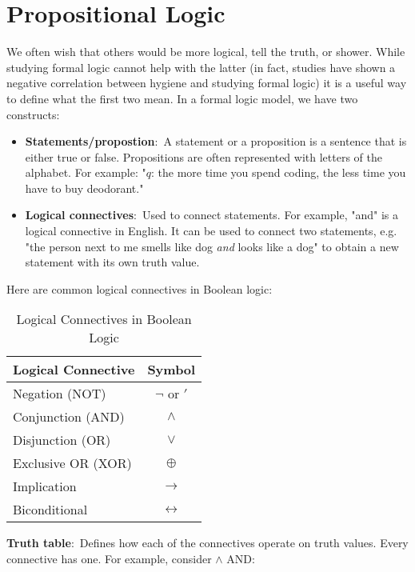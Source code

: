 \documentclass[nobib]{tufte-handout}
\newcommand{\defn}[2]{\noindent\textbf{#1}:\ #2}
\begin{document}
\pagebreak

\section{Propositional Logic}

We often wish that others would be more logical, tell the truth,
or shower. While studying formal logic cannot help with the latter
(in fact, studies have shown a negative correlation between
hygiene and studying formal logic) it is a useful way to 
define what the first two mean. In a formal logic model, we have two constructs:
\begin{itemize}
    \item \defn{Statements/propostion}{A statement or a proposition is a sentence that
    is either true or false.} Propositions are often represented 
    with letters of the alphabet. For example: "$q$: the more time
    you spend coding, the less time you have to buy deodorant."
    \item \defn{Logical connectives}{Used to connect statements.} For 
    example, "and" is a logical connective in English. It can be
    used to connect two statements, e.g. "the person next to me
    smells like dog \emph{and} looks like a dog" to obtain 
    a new statement with its own truth value. 
\end{itemize}

Here are common logical connectives in Boolean logic:
\begin{table}[h]
    \centering
    \begin{tabular}{lc}
    \toprule
    \textbf{Logical Connective} & \textbf{Symbol} \\
    \midrule
    Negation (NOT) & $\lnot$ or $'$ \\
    Conjunction (AND) & $\land$ \\
    Disjunction (OR) & $\lor$ \\
    Exclusive OR (XOR) & $\oplus$ \\
    Implication & $\rightarrow$ \\
    Biconditional & $\leftrightarrow$ \\
    \bottomrule
    \end{tabular}
    \caption{Logical Connectives in Boolean Logic}
    \label{tab:logical-connectives}
\end{table}

\defn{Truth table}{Defines how each of the
connectives operate on truth values. Every connective has one.}
For example, consider $\land$ AND:
\end{document}
